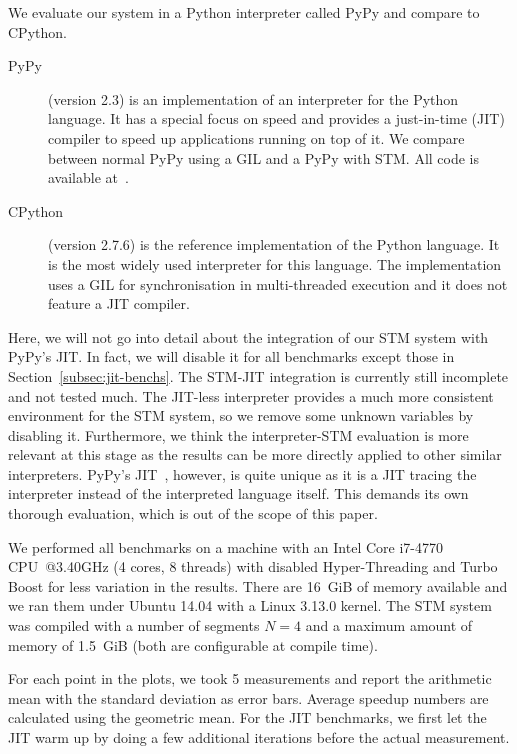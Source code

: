\documentclass{sigplanconf}
\begin{document}
We evaluate our system in a Python interpreter called
PyPy and compare to CPython.
\begin{description}
\item[PyPy] (version 2.3) is an implementation of an
  interpreter for the Python language. It has a special focus on speed
  and provides a just-in-time (JIT) compiler to speed up applications
  running on top of it. We compare between normal PyPy
  using a GIL and a PyPy with STM. All code is available at~\cite{pypy}.
\item[CPython] (version 2.7.6) is the reference implementation of the Python
  language. It is the most widely used interpreter for this language.
  The implementation uses a GIL for synchronisation in multi-threaded
  execution and it does not feature a JIT compiler.
\end{description}

Here, we will not go into detail about the integration of our STM
system with PyPy's JIT. In fact, we will disable it for all benchmarks
except those in Section~\ref{subsec:jit-benchs}. The STM-JIT
integration is currently still incomplete and not tested much. The
JIT-less interpreter provides a much more consistent environment for
the STM system, so we remove some unknown variables by disabling it.
Furthermore, we think the interpreter-STM evaluation is more relevant
at this stage as the results can be more directly applied to other
similar interpreters. PyPy's JIT~\cite{cfbolz09}, however, is quite
unique as it is a JIT tracing the interpreter instead of the
interpreted language itself. This demands its own thorough
evaluation, which is out of the scope of this paper.


We performed all benchmarks on a machine with an Intel Core i7-4770
CPU~@3.40GHz (4 cores, 8 threads) with disabled Hyper-Threading and
Turbo Boost for less variation in the results.  There are 16~GiB of memory
available and we ran them under Ubuntu 14.04 with a Linux 3.13.0
kernel. The STM system was compiled with a number of segments $N=4$
and a maximum amount of memory of 1.5~GiB (both are configurable at
compile time).

For each point in the plots, we took 5 measurements and report the
arithmetic mean with the standard deviation as error bars. Average
speedup numbers are calculated using the geometric mean. For the JIT
benchmarks, we first let the JIT warm up by doing a few additional
iterations before the actual measurement.

\end{document}

